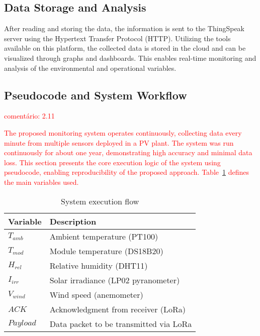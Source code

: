 \documentclass{ieeeaccess}
\begin{document}
\subsection{Data Storage and Analysis}
After reading and storing the data, the information is sent to the ThingSpeak server using the Hypertext Transfer Protocol (HTTP). Utilizing the tools available on this platform, the collected data is stored in the cloud and can be visualized through graphs and dashboards. This enables real-time monitoring and analysis of the environmental and operational variables.

\subsection{Pseudocode and System Workflow}
\label{sec:pseudocode}

\textcolor{red}{comentário: 2.11}

\textcolor{red}{
The proposed monitoring system operates continuously, collecting data every minute from multiple sensors deployed in a PV plant. The system was run continuously for about one year, demonstrating high accuracy and minimal data loss. This section presents the core execution logic of the system using pseudocode, enabling reproducibility of the proposed approach. Table~\ref{tab:variables} defines the main variables used.
}
\begin{table}[h!]
\caption{System execution flow}
\label{tab:variables}
\centering
\begin{tabular}{ll}
\toprule
\textbf{Variable} & \textbf{Description} \\
\midrule
$T_{amb}$ & Ambient temperature (PT100) \\
$T_{mod}$ & Module temperature (DS18B20) \\
$H_{rel}$ & Relative humidity (DHT11) \\
$I_{irr}$ & Solar irradiance (LP02 pyranometer) \\
$V_{wind}$ & Wind speed (anemometer) \\
$ACK$ & Acknowledgment from receiver (LoRa) \\
$Payload$ & Data packet to be transmitted via LoRa \\
\bottomrule
\end{tabular}
\end{table}
\end{document}
